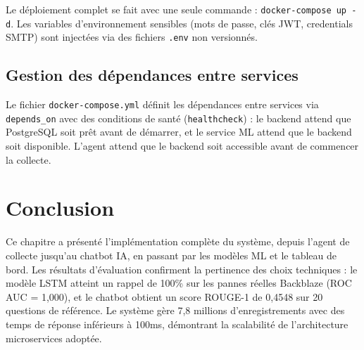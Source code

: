 Le déploiement complet se fait avec une seule commande : \texttt{docker-compose up -d}.
Les variables d'environnement sensibles (mots de passe, clés JWT, credentials SMTP)
sont injectées via des fichiers \texttt{.env} non versionnés.

\subsection{Gestion des dépendances entre services}

Le fichier \texttt{docker-compose.yml} définit les dépendances entre services via
\texttt{depends\_on} avec des conditions de santé (\texttt{healthcheck}) :
le backend attend que PostgreSQL soit prêt avant de démarrer, et le service ML attend
que le backend soit disponible. L'agent attend que le backend soit accessible avant
de commencer la collecte.

\section{Conclusion}

Ce chapitre a présenté l'implémentation complète du système, depuis l'agent de collecte
jusqu'au chatbot IA, en passant par les modèles ML et le tableau de bord. Les résultats
d'évaluation confirment la pertinence des choix techniques : le modèle LSTM atteint un
rappel de 100\% sur les pannes réelles Backblaze (ROC AUC = 1,000), et le chatbot obtient
un score ROUGE-1 de 0,4548 sur 20 questions de référence. Le système gère 7,8 millions
d'enregistrements avec des temps de réponse inférieurs à 100ms, démontrant la scalabilité
de l'architecture microservices adoptée.
